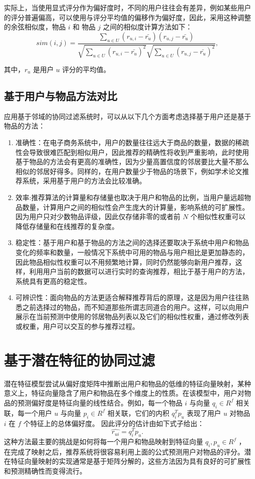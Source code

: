 实际上，当使用显式评分作为偏好度时，不同的用户往往会有差异，例如某些用户的评分普遍偏高，可以使用与评分平均值的偏移作为偏好度，因此，采用这种调整的余弦相似度，物品 $i$ 和 物品 $j$ 之间的相似度计算方法如下：
\begin{equation}
sim(i,j) = \dfrac{\sum\limits_{u \in U} (r_{u,i} - \bar{r_u})  (r_{u,j} - \bar{r_u})} {   \sqrt {\sum\limits_{u \in U}  {(r_{u,i} - \bar{r_u})}^2  }    \sqrt {\sum\limits_{u \in U}  {(r_{u,j} - \bar{r_u})}^2  }  } ,
\end{equation}

其中，$r_u$ 是用户 $u$ 评分的平均值。

\subsection{基于用户与物品方法对比}
应用基于邻域的协同过滤系统时，可以从以下几个方面考虑选择基于用户还是基于物品的方法\cite{Desrosiers2011A}：
\begin{enumerate}[itemindent=1em]
	\item {准确性}：在电子商务系统中，用户的数量往往远大于商品的数量，数据的稀疏性会导致很难匹配到相似用户，因此推荐的精确性将收到严重影响，此时使用基于物品的方法会有更高的准确性，因为少量高置信度的邻居要比大量不那么相似的邻居好得多。同样的，在用户数量少于物品的场景下，例如学术论文推荐系统，采用基于用户的方法会比较准确。
	\item {效率}:推荐算法的计算量和存储量也取决于用户和物品的比例，当用户量远超物品数量，计算用户之间的相似性会产生庞大的计算量，影响系统的可扩展性。因为用户只对少数物品评级，因此仅存储非零的或者前 $N$ 个相似性权重可以降低存储量和在线推荐的复杂度。
	\item {稳定性}：基于用户和基于物品的方法之间的选择还要取决于系统中用户和物品变化的频率和数量，一般情况下系统中可用的物品与用户相比是更加静态的，因此物品相似性权重可以不用频繁地计算，同时仍然能够向新用户推荐，这样，利用用户当前的数据可以进行实时的查询推荐，相比于基于用户的方法，系统具有更高的稳定性。
	\item {可辨识性}：面向物品的方法更适合解释推荐背后的原理，这是因为用户往往熟悉之前选择过的物品，而不知道那些所谓志同道合的用户。这样，可以向用户展示在当前预测中使用的邻居物品列表以及它们的相似性权重，通过修改列表或权重，用户可以交互的参与推荐过程。
\end{enumerate}

\section{基于潜在特征的协同过滤} 
潜在特征模型尝试从偏好度矩阵中推断出用户和物品的低维的特征向量映射，某种意义上，特征向量隐含了用户和物品在多个维度上的性质。在该模型中，用户对物品的预测偏好度是特征向量的线性结合。例如，每一个物品 $i$ 与向量 $q_i \in R^f$ 相关联，每一个用户 $u$ 与向量 $p_i \in R^f$ 相关联，它们的内积 $q_i^Tp_u$ 表现了用户 $u$ 对物品 $i$ 在 $f$ 个特征上的总体偏好度。 因此评分的估计由如下式子给出：
$$
\hat{r_{ui}} = q_i^Tp_u.
$$
这种方法最主要的挑战是如何将每一个用户和物品映射到特征向量 $q_i, p_u \in R^f$ ，在完成了映射之后，推荐系统将很容易利用上面的公式预测用户对物品的评分。潜在特征向量映射的实现通常是基于矩阵分解的，这些方法因为具有良好的可扩展性和预测精确性而变得流行。

